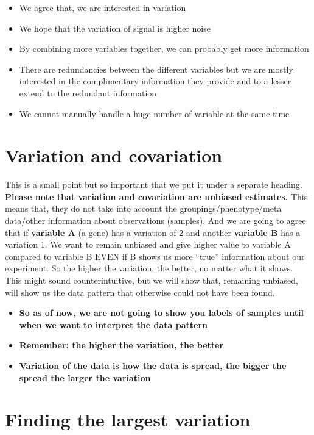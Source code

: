 \documentclass[
]{book}
\providecommand{\tightlist}{%
  \setlength{\itemsep}{0pt}\setlength{\parskip}{0pt}}
\theoremstyle{definition}
\theoremstyle{definition}
\theoremstyle{definition}
\theoremstyle{remark}
\begin{document}
\begin{itemize}
\tightlist
\item
  We agree that, we are interested in variation
\item
  We hope that the variation of signal is higher noise
\item
  By combining more variables together, we can probably get more information
\item
  There are redundancies between the different variables but we are mostly interested in the complimentary information they provide and to a lesser extend to the redundant information
\item
  We cannot manually handle a huge number of variable at the same time
\end{itemize}

\hypertarget{variation-and-covariation}{%
\section{Variation and covariation}\label{variation-and-covariation}}

This is a small point but so important that we put it under a separate heading. \textbf{Please note that variation and covariation are unbiased estimates.} This means that, they do not take into account the groupings/phenotype/meta data/other information about observations (samples). And we are going to agree that if \textbf{variable A} (a gene) has a variation of 2 and another \textbf{variable B} has a variation 1. We want to remain unbiased and give higher value to variable A compared to variable B EVEN if B shows us more ``true'' information about our experiment. So the higher the variation, the better, no matter what it shows. This might sound counterintuitive, but we will show that, remaining unbiased, will show us the data pattern that otherwise could not have been found.

\begin{itemize}
\tightlist
\item
  \textbf{So as of now, we are not going to show you labels of samples until when we want to interpret the data pattern}
\item
  \textbf{Remember: the higher the variation, the better}
\item
  \textbf{Variation of the data is how the data is spread, the bigger the spread the larger the variation}
\end{itemize}

\hypertarget{pcavar}{%
\section{Finding the largest variation}\label{pcavar}}
\end{document}
